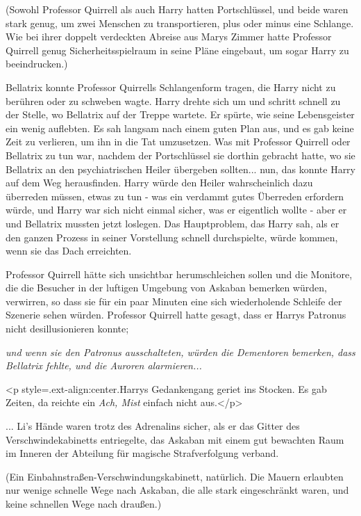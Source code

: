(Sowohl Professor Quirrell als auch Harry hatten Portschlüssel, und beide waren
stark genug, um zwei Menschen zu transportieren, plus oder minus eine Schlange.
Wie bei ihrer doppelt verdeckten Abreise aus Marys Zimmer hatte Professor
Quirrell genug Sicherheitsspielraum in seine Pläne eingebaut, um sogar Harry zu
beeindrucken.)

Bellatrix konnte Professor Quirrells Schlangenform tragen, die Harry nicht zu
berühren oder zu schweben wagte. Harry drehte sich um und schritt schnell zu der
Stelle, wo Bellatrix auf der Treppe wartete. Er spürte, wie seine Lebensgeister
ein wenig auflebten. Es sah langsam nach einem guten Plan aus, und es gab keine
Zeit zu verlieren, um ihn in die Tat umzusetzen. Was mit Professor Quirrell oder
Bellatrix zu tun war, nachdem der Portschlüssel sie dorthin gebracht hatte, wo
sie Bellatrix an den psychiatrischen Heiler übergeben sollten... nun, das konnte
Harry auf dem Weg herausfinden. Harry würde den Heiler wahrscheinlich dazu
überreden müssen, etwas zu tun - was ein verdammt gutes Überreden erfordern
würde, und Harry war sich nicht einmal sicher, was er eigentlich wollte - aber
er und Bellatrix mussten jetzt loslegen. Das Hauptproblem, das Harry sah, als er
den ganzen Prozess in seiner Vorstellung schnell durchspielte, würde kommen,
wenn sie das Dach erreichten.

Professor Quirrell hätte sich unsichtbar herumschleichen sollen und die
Monitore, die die Besucher in der luftigen Umgebung von Askaban bemerken würden,
verwirren, so dass sie für ein paar Minuten eine sich wiederholende Schleife der
Szenerie sehen würden. Professor Quirrell hatte gesagt, dass er Harrys Patronus
nicht desillusionieren konnte;

\emph{und wenn sie den Patronus ausschalteten, würden die Dementoren bemerken, dass Bellatrix fehlte, und die Auroren alarmieren... }

<p style=\grqq{}.ext-align:center\grqq{}.Harrys Gedankengang geriet ins Stocken.
Es gab Zeiten, da reichte ein \emph{ \glqq Ach, Mist\grqq{} } einfach nicht
aus.</p>


... Li's Hände waren trotz des Adrenalins sicher, als er das Gitter des
Verschwindekabinetts entriegelte, das Askaban mit einem gut bewachten Raum im
Inneren der Abteilung für magische Strafverfolgung verband.

(Ein Einbahnstraßen-Verschwindungskabinett, natürlich. Die Mauern erlaubten nur
wenige schnelle Wege nach Askaban, die alle stark eingeschränkt waren, und keine
schnellen Wege nach draußen.)

